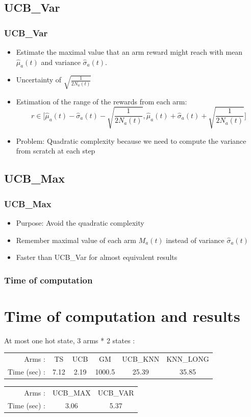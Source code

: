 \documentclass[french]{beamer}
\begin{document}
\subsection{UCB\_Var}
\begin{frame}
	\frametitle{UCB\_Var}

	\begin{itemize}
		\item Estimate the maximal value that an arm reward might reach with mean $\hat\mu_a(t)$ and variance $\hat\sigma_a(t)$.
		\item Uncertainty of $\sqrt{\frac{1}{2N_a(t)}}$
		\item Estimation of the range of the rewards from each arm:
		\begin{equation*}
			r \in \Big[\hat\mu_a(t)-\hat\sigma_a(t)-\sqrt{\frac{1}{2N_a(t)}}, \hat\mu_a(t)+\hat\sigma_a(t)+\sqrt{\frac{1}{2N_a(t)}}\Big]
		\end{equation*}
		\item Problem: Quadratic complexity because we need to compute the variance from scratch at each step
	\end{itemize}

\end{frame}

\subsection{UCB\_Max}
\begin{frame}
	\frametitle{UCB\_Max}
	\begin{itemize}
		\item Purpose: Avoid the quadratic complexity
		\item Remember maximal value of each arm $M_a(t)$ instead of variance $\hat\sigma_a(t)$
		\item Faster than UCB\_Var for almost equivalent results
	\end{itemize}
\end{frame}

\begin{frame}
	\frametitle{Time of computation}

	\section{Time of computation and results}

	 At most one hot state, 3 arms * 2 states :
	 \newline


	 	\begin{tabular}{rccccc}
	 		Arms : & TS & UCB & GM & UCB\_KNN & KNN\_LONG \\
	 		Time (sec) : & 7.12 & 2.19 & 1000.5 & 25.39 & 35.85
	 	\end{tabular}
	 	\newline
	 	\newline

	 	\begin{tabular}{rcc}
	 		Arms : & UCB\_MAX & UCB\_VAR \\
	 		Time (sec) : & 3.06 & 5.37
	 	\end{tabular}

\end{frame}
\end{document}
